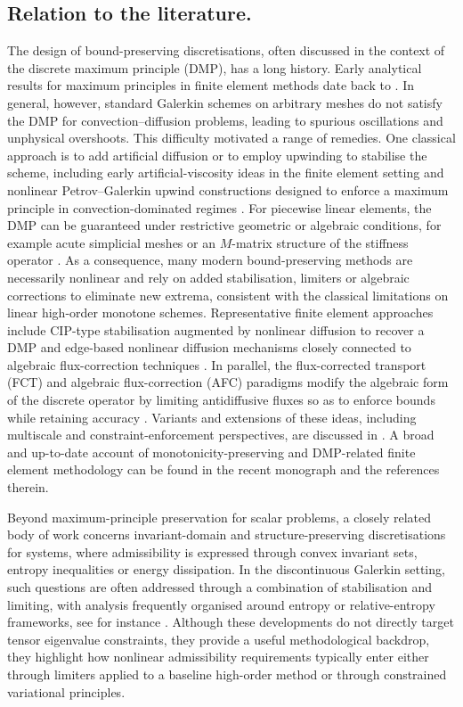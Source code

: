 \documentclass[final,12pt]{amsart}
\theoremstyle{plain}
\theoremstyle{definition}
\begin{document}
\subsection*{Relation to the literature.}
The design of bound-preserving discretisations, often discussed in the
context of the discrete maximum principle (DMP), has a long history.
Early analytical results for maximum principles in finite element
methods date back to \cite{CR73}. In general, however, standard
Galerkin schemes on arbitrary meshes do not satisfy the DMP for
convection--diffusion problems, leading to spurious oscillations and
unphysical overshoots. This difficulty motivated a range of remedies.
One classical approach is to add artificial diffusion or to employ
upwinding to stabilise the scheme, including early
artificial-viscosity ideas in the finite element setting
\cite{kikuchi1977discrete} and nonlinear Petrov--Galerkin upwind
constructions designed to enforce a maximum principle in
convection-dominated regimes \cite{MH85}. For piecewise linear
elements,  the DMP can be guaranteed under restrictive geometric or
algebraic conditions, for example acute simplicial meshes or an
$M$-matrix structure of the stiffness operator
\cite{brandts2008discrete}. As a consequence, many modern
bound-preserving methods are necessarily nonlinear and rely on added
stabilisation, limiters or algebraic corrections to eliminate new
extrema, consistent with the classical limitations on linear
high-order monotone schemes. Representative finite element approaches
include CIP-type stabilisation augmented by nonlinear diffusion to
recover a DMP \cite{BE05} and edge-based nonlinear diffusion
mechanisms closely connected to algebraic flux-correction techniques
\cite{BBK17-NumMath}. In parallel, the flux-corrected transport (FCT)
and algebraic flux-correction (AFC) paradigms modify the algebraic
form of the discrete operator by limiting antidiffusive fluxes so as
to enforce bounds while retaining accuracy \cite{Kuz07}. Variants and
extensions of these ideas, including multiscale and
constraint-enforcement perspectives, are discussed in \cite{EHS09}. A
broad and up-to-date account of monotonicity-preserving and
DMP-related finite element methodology can be found in the recent
monograph \cite{BJK25} and the references therein.

Beyond maximum-principle preservation for scalar problems, a closely
related body of work concerns invariant-domain and
structure-preserving discretisations for systems, where admissibility
is expressed through convex invariant sets, entropy inequalities or
energy dissipation.  In the discontinuous Galerkin setting, such
questions are often addressed through a combination of stabilisation
and limiting, with analysis frequently organised around entropy or
relative-entropy frameworks, see for instance
\cite{giesselmann2015posteriori,giesselmann2016reduced}.  Although
these developments do not directly target tensor eigenvalue
constraints, they provide a useful methodological backdrop, they
highlight how nonlinear admissibility requirements typically enter
either through limiters applied to a baseline high-order method or
through constrained variational principles. 
\end{document}
